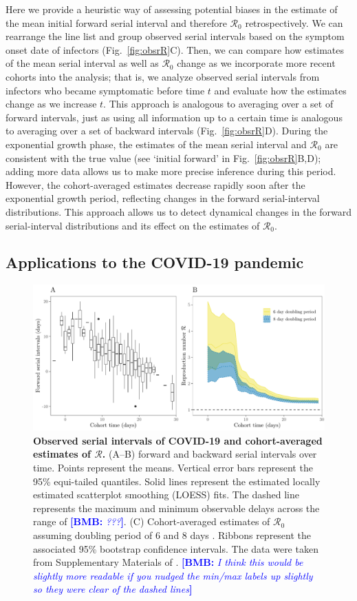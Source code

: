 \documentclass[12pt]{article}
\newcommand{\comment}{\showcomment}
\newcommand{\showcomment}[3]{\textcolor{#1}{\textbf{[#2: }\textsl{#3}\textbf{]}}}
\newcommand{\bmb}[1]{\comment{blue}{BMB}{#1}}
\newcommand{\fref}[1]{Fig.~\ref{fig:#1}}
\newcommand{\Rx}[1]{\ensuremath{{\mathcal R}_{#1}}\xspace}
\newcommand{\Ro}{\Rx{0}}
\newcommand{\RR}{\ensuremath{{\mathcal R}}\xspace}
\begin{document}
Here we provide a heuristic way of assessing potential biases in the estimate of the mean initial forward serial interval and therefore \Ro retrospectively.
We can rearrange the line list and group observed serial intervals based on the symptom onset date of infectors (\fref{obsrR}C).
Then, we can compare how estimates of the mean serial interval as well as \Ro change as we incorporate more recent cohorts into the analysis;
that is, we analyze observed serial intervals from infectors who became symptomatic before time $t$ and evaluate how the estimates change as we increase $t$.
This approach is analogous to averaging over a set of forward intervals, just as using all information up to a certain time is analogous to averaging over a set of backward intervals (\fref{obsrR}D).
During the exponential growth phase, the estimates of the mean serial interval and \Ro are consistent with the true value (see `initial forward' in \fref{obsrR}B,D);
adding more data allows us to make more precise inference during this period.
However, the cohort-averaged estimates decrease rapidly soon after the exponential growth period, reflecting changes in the forward serial-interval distributions.
This approach allows us to detect dynamical changes in the forward serial-interval distributions and its effect on the estimates of \Ro.

\subsection{Applications to the COVID-19 pandemic}

\begin{figure}[!th]
\includegraphics[width=\textwidth]{serial_analysis.pdf}
\caption{
\textbf{Observed serial intervals of COVID-19 and cohort-averaged estimates of \RR.}
(A--B) forward and backward serial intervals over time.
Points represent the means. 
Vertical error bars represent the 95\% equi-tailed quantiles.
Solid lines represent the estimated locally estimated scatterplot smoothing (LOESS) fits.
The dashed line represents the maximum and minimum observable delays across the range of \bmb{???}.
(C) Cohort-averaged estimates of \Ro assuming doubling period of 6 and 8 days \citep{li2020early, wu2020nowcasting}.
Ribbons represent the associated 95\% bootstrap confidence intervals.
The data were taken from Supplementary Materials of \cite{du2020serial}.
\bmb{I think this would be slightly more readable if you nudged the min/max labels up slightly so they were clear of the dashed lines}
}
\label{fig:du}
\end{figure}
\end{document}
